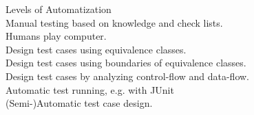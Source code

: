 \begin{Frame}{Levels of Automatization}
   \\
    Manual testing based on knowledge and check lists. \hfill\vspace{1ex}\linebreak
   \\
    Humans play computer. \hfill\vspace{1ex}\linebreak
   \\
    Design test cases using equivalence classes.\hfill\vspace{1ex}\linebreak
   \\
    Design test cases using boundaries of equivalence classes.\hfill\vspace{1ex}\linebreak
   \\
    Design test cases by analyzing control-flow and data-flow.\hfill\vspace{1ex}\linebreak
   \\
    Automatic test running, e.g. with JUnit\hfill\vspace{1ex}\linebreak
   \\
    (Semi-)Automatic test case design.
\end{Frame}
